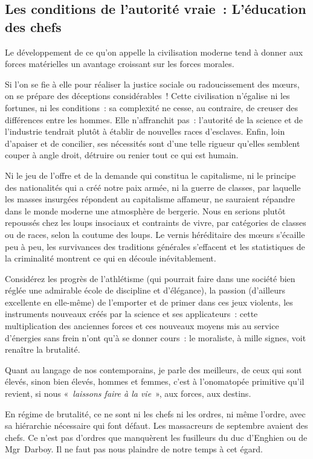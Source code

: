 \documentclass[french,twoside]{book} %
\begin{document}
\subsection[{Les conditions de l’autorité vraie : L’éducation des chefs}]{Les conditions de l’autorité vraie : L’éducation des chefs}
\noindent Le développement de ce qu’on appelle la civilisation moderne tend à donner aux forces matérielles un avantage croissant sur les forces morales.\par
Si l’on se fie à elle pour réaliser la justice sociale ou radoucissement des mœurs, on se prépare des déceptions considérables ! Cette civilisation n’égalise ni les fortunes, ni les conditions : sa complexité ne cesse, au contraire, de creuser des différences entre les hommes. Elle n’affranchit pas : l’autorité de la science et de l’industrie tendrait plutôt à établir de nouvelles races d’esclaves. Enfin, loin d’apaiser et de concilier, ses nécessités sont d’une telle rigueur qu’elles semblent couper à angle droit, détruire ou renier tout ce qui est humain.\par
Ni le jeu de l’offre et de la demande qui constitua le capitalisme, ni le principe des nationalités qui a créé notre paix armée, ni la guerre de classes, par laquelle les masses insurgées répondent au capitalisme affameur, ne sauraient répandre dans le monde moderne une atmosphère de bergerie. Nous en serions plutôt repoussés chez les loups insociaux et contraints de vivre, par catégories de classes ou de races, selon la coutume des loups. Le vernis héréditaire des mœurs s’écaille peu à peu, les survivances des traditions générales s’effacent et les statistiques de la criminalité montrent ce qui en découle inévitablement.\par
Considérez les progrès de l’athlétisme (qui pourrait faire dans une société bien réglée une admirable école de discipline et d’élégance), la passion (d’ailleurs excellente en elle-même) de l’emporter et de primer dans ces jeux violents, les instruments nouveaux créés par la science et ses applicateurs : cette multiplication des anciennes forces et ces nouveaux moyens mis au service d’énergies sans frein n’ont qu’à se donner cours : le moraliste, à mille signes, voit renaître la brutalité.\par
Quant au langage de nos contemporains, je parle des meilleurs, de ceux qui sont élevés, sinon bien élevés, hommes et femmes, c’est à l’onomatopée primitive qu’il revient, si nous «\emph{ laissons faire à la vie} », aux forces, aux destins.\par
En régime de brutalité, ce ne sont ni les chefs ni les ordres, ni même l’ordre, avec sa hiérarchie nécessaire qui font défaut. Les massacreurs de septembre avaient des chefs. Ce n’est pas d’ordres que manquèrent les fusilleurs du duc d’Enghien ou de Mgr Darboy. Il ne faut pas nous plaindre de notre temps à cet égard.\par
\end{document}
